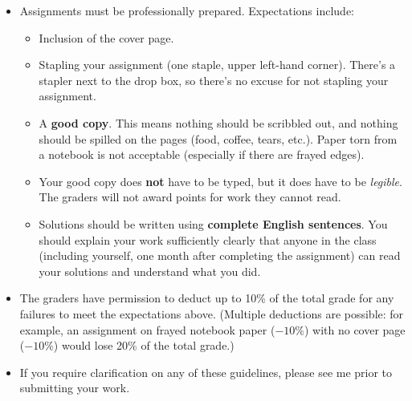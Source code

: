 \documentclass[letterpaper,12pt]{article}
\begin{document}
\begin{itemize}
\pagebreak
 \item Assignments must be professionally prepared. Expectations include:
 \begin{itemize}
  \item Inclusion of the cover page.
  \item Stapling your assignment (one staple, upper left-hand corner). There's a stapler next to the drop box, so there's no excuse for not stapling your assignment.
  \item A \textbf{good copy}. This means nothing should be scribbled out, and nothing should be spilled on the pages (food, coffee, tears, etc.). Paper torn from a notebook is not acceptable (especially if there are frayed edges).
  \item Your good copy does \textbf{not} have to be typed, but it does have to be \textit{legible}. The graders will not award points for work they cannot read.
  \item Solutions should be written using \textbf{complete English sentences}. You should explain your work sufficiently clearly that anyone in the class (including yourself, one month after completing the assignment) can read your solutions and understand what you did.
 \end{itemize}
  \item The graders have permission to deduct up to 10\% of the total grade for any failures to meet the expectations above. (Multiple deductions are possible: for example, an assignment on frayed notebook paper ($-10\%$) with no cover page ($-10\%$) would lose 20\% of the total grade.)
  \item If you require clarification on any of these guidelines, please see me prior to submitting your work.
\end{itemize}
\end{document}
